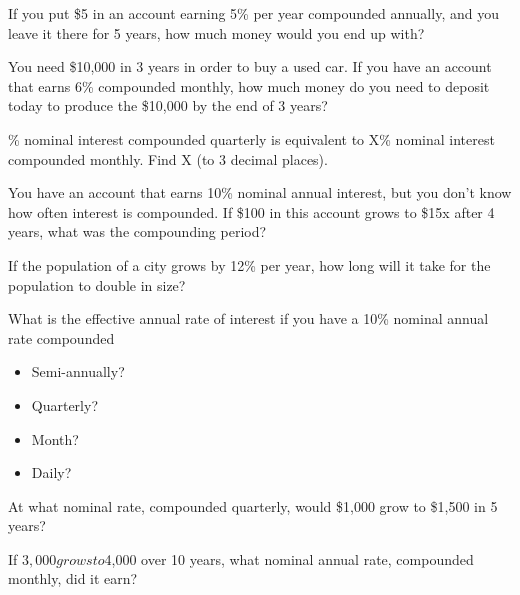 \documentclass[addpoints, 12pt]{exam}
\begin{document}
\begin{questions}

    \question If you put \$5 in an account earning 5\% per year compounded annually, and you leave it
    there for 5 years, how much money would you end up with?
    \vspace{2in}

    \question You need \$10,000 in 3 years in order to buy a used car. If you have an account
    that earns 6\% compounded monthly, how much money do you need to deposit today to
    produce the \$10,000 by the end of 3 years?
    \vspace{2in}

    \% nominal interest compounded quarterly is equivalent to X\% nominal interest
    compounded monthly. Find X (to 3 decimal places).
    \vspace{2in}

    \question You have an account that earns 10\% nominal annual interest, but you don’t know how
    often interest is compounded. If \$100 in this account grows to \$15x after 4 years, what
    was the compounding period?
    \vspace{1.5in}

    \question If the population of a city grows by 12\% per year, how long will it take for
    the population to double in size?
    \vspace{1.5in}

    \question What is the effective annual rate of interest if you have a 10\% nominal annual
    rate compounded
    \begin{itemize}
        \item Semi-annually?
        \item Quarterly?
        \item Month?
        \item Daily?
    \end{itemize}
    \vspace{2in}

    \question At what nominal rate, compounded quarterly, would \$1,000 grow to \$1,500 in 5 years?
    \vspace{2in}

    \question If $3,000 grows to $4,000 over 10 years, what nominal annual rate, compounded
    monthly, did it earn?
    \vspace{2in}

\end{questions}
\end{document}
